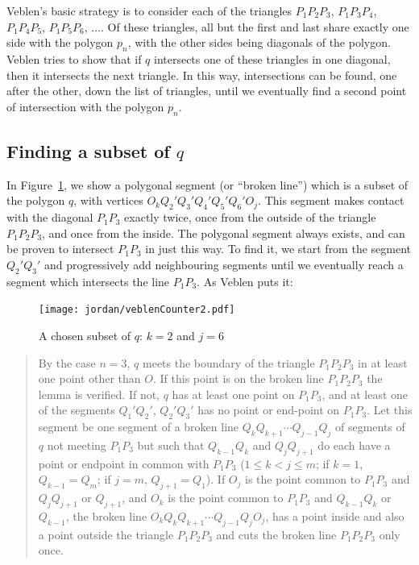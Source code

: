 Veblen's basic strategy is to consider each of the triangles $P_1P_2P_3$, $P_1P_3P_4$, $P_1P_4P_5$, $P_1P_5P_6$, $\ldots$. Of these triangles, all but the first and last share exactly one side with the polygon $p_n$, with the other sides being diagonals of the polygon. Veblen tries to show that if $q$ intersects one of these triangles in one diagonal, then it intersects the next triangle. In this way, intersections can be found, one after the other, down the list of triangles, until we eventually find a second point of intersection with the polygon $p_n$.

\subsection{Finding a subset of $q$}\label{sec:SubsetOfQ}
In Figure~\ref{fig:VeblenCounter2}, we show a polygonal segment  (or ``broken line'') which is a subset of the polygon $q$, with vertices $O_kQ_2'Q_3'Q_4'Q_5'Q_6'O_j$. This segment makes contact with the diagonal $P_1P_3$ exactly twice, once from the outside of the triangle $P_1P_2P_3$, and once from the inside. The polygonal segment always exists, and can be proven to intersect $P_1P_3$ in just this way. To find it, we start from the segment $Q_2'Q_3'$ and progressively add neighbouring segments until we eventually reach a segment which intersects the line $P_1P_3$. As Veblen puts it:

\begin{figure}
\centering
\texttt{[image: jordan/veblenCounter2.pdf]}
\caption{A chosen subset of $q$: $k=2$ and $j=6$}
\label{fig:VeblenCounter2}
\end{figure}

\begin{quote}By the case $n=3$, $q$ meets the boundary of the triangle $P_1P_2P_3$ in at least one point other than $O$. If this point is on the broken line $P_1P_2P_3$ the lemma is verified. If not, $q$ has at least one point on $P_1P_3$, and at least one of the segments $Q_1'Q_2'$, $Q_2'Q_3'$ has no point or end-point on $P_1P_3$. Let this segment be one segment of a broken line $Q_kQ_{k+1}\cdots Q_{j-1}Q_j$ of segments of $q$ not meeting $P_1P_3$ but such that $Q_{k-1}Q_k$ and $Q_jQ_{j+1}$ do each have a point or endpoint in common with $P_1P_3$ ($1 \leq k < j \leq m$; if $k = 1$, $Q_{k-1} = Q_m$; if $j = m$, $Q_{j+1} = Q_1$). If $O_j$ is the point common to $P_1P_3$ and $Q_jQ_{j+1}$ or $Q_{j+1}$, and $O_k$ is the point common to $P_1P_3$ and $Q_{k-1}Q_k$ or $Q_{k-1}$, the broken line $O_kQ_kQ_{k+1}\cdots Q_{j-1}Q_jO_j$, has a point inside and also a point outside the triangle $P_1P_2P_3$ and cuts the broken line $P_1P_2P_3$ only once. \end{quote}

